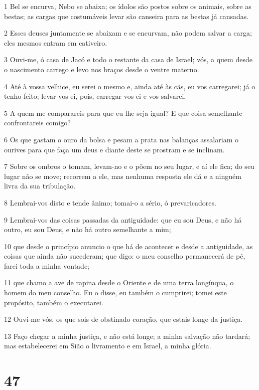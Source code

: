 \par 1 Bel se encurva, Nebo se abaixa; os ídolos são postos sobre os animais, sobre as bestas; as cargas que costumáveis levar são canseira para as bestas já cansadas.
\par 2 Esses deuses juntamente se abaixam e se encurvam, não podem salvar a carga; eles mesmos entram em cativeiro.
\par 3 Ouvi-me, ó casa de Jacó e todo o restante da casa de Israel; vós, a quem desde o nascimento carrego e levo nos braços desde o ventre materno.
\par 4 Até à vossa velhice, eu serei o mesmo e, ainda até às cãs, eu vos carregarei; já o tenho feito; levar-vos-ei, pois, carregar-vos-ei e vos salvarei.
\par 5 A quem me comparareis para que eu lhe seja igual? E que coisa semelhante confrontareis comigo?
\par 6 Os que gastam o ouro da bolsa e pesam a prata nas balanças assalariam o ourives para que faça um deus e diante deste se prostram e se inclinam.
\par 7 Sobre os ombros o tomam, levam-no e o põem no seu lugar, e aí ele fica; do seu lugar não se move; recorrem a ele, mas nenhuma resposta ele dá e a ninguém livra da sua tribulação.
\par 8 Lembrai-vos disto e tende ânimo; tomai-o a sério, ó prevaricadores.
\par 9 Lembrai-vos das coisas passadas da antiguidade: que eu sou Deus, e não há outro, eu sou Deus, e não há outro semelhante a mim;
\par 10 que desde o princípio anuncio o que há de acontecer e desde a antiguidade, as coisas que ainda não sucederam; que digo: o meu conselho permanecerá de pé, farei toda a minha vontade;
\par 11 que chamo a ave de rapina desde o Oriente e de uma terra longínqua, o homem do meu conselho. Eu o disse, eu também o cumprirei; tomei este propósito, também o executarei.
\par 12 Ouvi-me vós, os que sois de obstinado coração, que estais longe da justiça.
\par 13 Faço chegar a minha justiça, e não está longe; a minha salvação não tardará; mas estabelecerei em Sião o livramento e em Israel, a minha glória.

\chapter{47}

